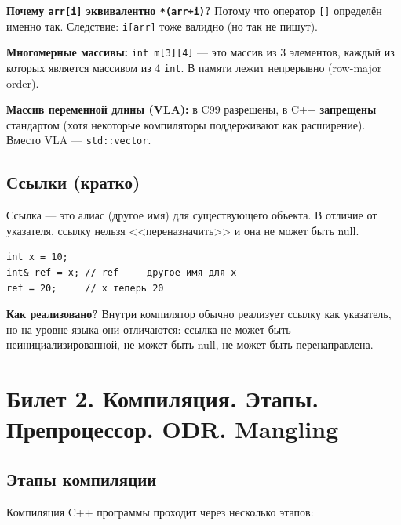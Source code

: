 \documentclass[12pt,a4paper]{article}
\begin{document}
\textbf{Почему \texttt{arr[i]} эквивалентно \texttt{*(arr+i)}?} Потому что оператор \texttt{[]} определён именно так. Следствие: \texttt{i[arr]} тоже валидно (но так не пишут).

\textbf{Многомерные массивы:} \texttt{int m[3][4]} --- это массив из 3 элементов, каждый из которых является массивом из 4 \texttt{int}. В памяти лежит непрерывно (row-major order).

\textbf{Массив переменной длины (VLA):} в C99 разрешены, в C++ \textbf{запрещены} стандартом (хотя некоторые компиляторы поддерживают как расширение). Вместо VLA --- \texttt{std::vector}.

\subsection{Ссылки (кратко)}
Ссылка --- это алиас (другое имя) для существующего объекта. В отличие от указателя, ссылку нельзя <<переназначить>> и она не может быть null.
\begin{lstlisting}
int x = 10;
int& ref = x; // ref --- другое имя для x
ref = 20;     // x теперь 20
\end{lstlisting}
\textbf{Как реализовано?} Внутри компилятор обычно реализует ссылку как указатель, но на уровне языка они отличаются: ссылка не может быть неинициализированной, не может быть null, не может быть перенаправлена.

\section{Билет 2. Компиляция. Этапы. Препроцессор. ODR. Mangling}

\subsection{Этапы компиляции}

Компиляция C++ программы проходит через несколько этапов:
\end{document}
